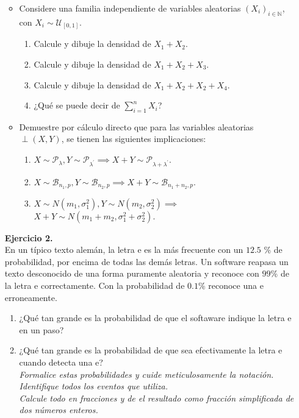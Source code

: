 \documentclass[12pt,a4paper]{article}
\newcommand{\N}{\mathbb{N}}
\begin{document}
\begin{enumerate}
\begin{itemize}
\begin{enumerate}
 			\end{enumerate}
 			\item Considere una familia independiente de variables aleatorias $(X_i)_{i\in \N}$, con $X_i\sim\mathcal{U}_{[0,1]}$.
 			\begin{enumerate}
 				\item Calcule y dibuje la densidad de $X_1+X_2.$
 				\item Calcule y dibuje la densidad de $X_1+X_2+X_3.$
 				\item Calcule y dibuje la densidad de $X_1+X_2+X_2+X_4.$
 				\item ¿Qué se puede decir de $\sum_{i=1}^{n}X_i$?
 			\end{enumerate}
 			\item Demuestre por cálculo directo que para las variables aleatorias $\perp(X,Y)$, se tienen las siguientes implicaciones:
 			\begin{enumerate}
 				\item $X \sim \mathcal{P}_{\lambda}, Y \sim \mathcal{P}_{\lambda^{\prime}} \implies X+Y \sim \mathcal{P}_{\lambda+\lambda^\prime}.$
 				\item $X \sim \mathcal{B}_{n_1,p}, Y \sim \mathcal{B}_{n_2,p} \implies X+Y \sim \mathcal{B}_{n_1+n_2,p}.$
 					\item $X \sim N(m_1,\sigma_1^2), Y \sim N(m_2,\sigma_2^2)\implies$\\$ X+Y \sim N(m_1+m_2,\sigma_1^2+\sigma_2^2).$
 			\end{enumerate} 
 		\end{itemize}
 		\item[\textbf{Ejercicio 2.}]
 		$\;$\\
 		En un típico texto alemán, la letra e es la más frecuente con un $12.5$ \% de probabilidad, por encima de todas las demás letras. Un software reapasa un texto desconocido de una forma puramente aleatoria y reconoce con $99$\% de la letra e correctamente. Con la probabilidad de $0.1$\% reconoce una e erroneamente.
 		\begin{enumerate}
 			\item ¿Qué tan grande es la probabilidad de que el softaware indique la letra e en un paso?
 			\item ¿Qué tan grande es la probabilidad de que sea efectivamente la letra e cuando detecta una e?\\
 			\textit{Formalice estas probabilidades y cuide meticulosamente la notación.\\
 				Identifique todos los eventos que utiliza.\\
 				Calcule todo en fracciones y de el resultado como fracción simplificada de dos números enteros.}
 			

\end{enumerate}
\end{enumerate}
\end{document}
